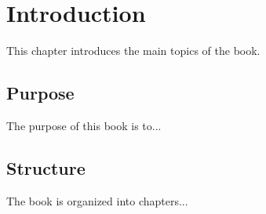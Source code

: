 \chapter{Introduction}
This chapter introduces the main topics of the book.

\section{Purpose}
The purpose of this book is to...

\section{Structure}
The book is organized into chapters...